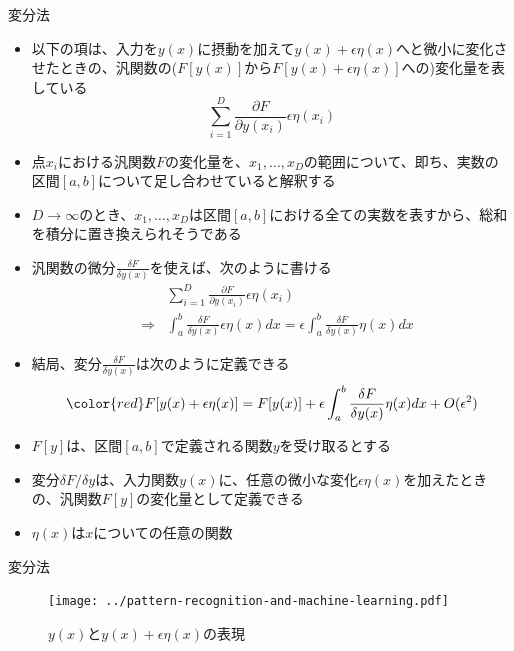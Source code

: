 \documentclass[dvipdfmx,notheorems,t]{beamer}
\begin{document}
\begin{frame}{変分法}
\begin{itemize}
\begin{itemize}
		\item 以下の項は、入力を$y(x)$に摂動を加えて$y(x) + \epsilon \eta(x)$へと微小に変化させたときの、汎関数の($F[y(x)]$から$F[y(x) + \epsilon \eta(x)]$への)変化量を表している
		\begin{equation}
			\sum_{i = 1}^D \frac{\partial F}{\partial y(x_i)} \epsilon \eta(x_i)
		\end{equation}
		
		\item 点$x_i$における汎関数$F$の変化量を、$x_1, \ldots, x_D$の範囲について、即ち、実数の区間$[a, b]$について足し合わせていると解釈する
		\newline
		\item $D \to \infty$のとき、$x_1, \ldots, x_D$は区間$[a, b]$における全ての実数を表すから、総和を積分に置き換えられそうである
		\newline
		\item \color{red}汎関数の微分$\displaystyle \frac{\delta F}{\delta y(x)}$\normalcolor を使えば、次のように書ける
		\begin{eqnarray}
			&& \sum_{i = 1}^D \frac{\partial F}{\partial y(x_i)} \epsilon \eta(x_i) \nonumber \\
			&\Rightarrow& \int_a^b \frac{\delta F}{\delta y(x)} \epsilon \eta(x) dx = \epsilon \int_a^b \frac{\delta F}{\delta y(x)} \eta(x) dx
		\end{eqnarray}
		
		\item 結局、変分$\displaystyle \frac{\delta F}{\delta y(x)}$は次のように定義できる
		\begin{equation}
			\color{red}F[y(x) + \epsilon \eta(x)] = F[y(x)] + \epsilon \int_a^b \frac{\delta F}{\delta y(x)} \eta(x) dx + O(\epsilon^2)\normalcolor
		\end{equation}
		\item $F[y]$は、区間$[a, b]$で定義される関数$y$を受け取るとする
		\newline
		\item 変分$\delta F/\delta y$は、入力関数$y(x)$に、任意の微小な変化$\epsilon \eta(x)$を加えたときの、\color{red}汎関数$F[y]$の変化量\normalcolor として定義できる
		\item $\eta(x)$は$x$についての任意の関数
	\end{itemize}
\end{itemize}

\end{frame}

\begin{frame}{変分法}

\begin{figure}[h]
	\centering
	\texttt{[image: ../pattern-recognition-and-machine-learning.pdf]}
	\caption{$y(x)$と$y(x) + \epsilon \eta(x)$の表現}
\end{figure}

\end{frame}
\end{document}
